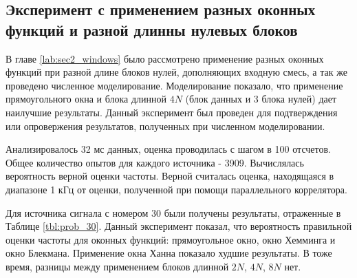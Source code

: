 {\begin{tabular}{ | c | c | c | c |}
	\end{tabular}%
} 

\subsection{Эксперимент с применением разных оконных функций и разной длинны нулевых блоков}

В главе \ref{lab:sec2_windows} было рассмотрено применение разных оконных функций при разной длине блоков нулей, дополняющих входную смесь, а так же проведено численное моделирование.
Моделирование показало, что применение прямоугольного окна и блока длинной ${4N}$ (блок данных и 3 блока нулей) дает наилучшие результаты. Данный эксперимент был проведен для
подтверждения или опровержения результатов, полученных при численном моделировании.

Анализировалось 32 мс данных, оценка проводилась с шагом в 100 отсчетов. Общее количество опытов для каждого источника - 3909. Вычислялась вероятность верной оценки частоты. Верной
считалась оценка, находящаяся в диапазоне 1 кГц от оценки, полученной при помощи параллельного коррелятора.

Для источника сигнала с номером 30 были получены результаты, отраженные в Таблице \ref{tbl:prob_30}. Данный эксперимент показал, что вероятность правильной оценки частоты для
оконных функций: прямоугольное окно, окно Хемминга и окно Блекмана. Применение окна Ханна показало худшие результаты. В тоже время, разницы между применением блоков длинной ${2N}$,
${4N}$, ${8N}$ нет.

